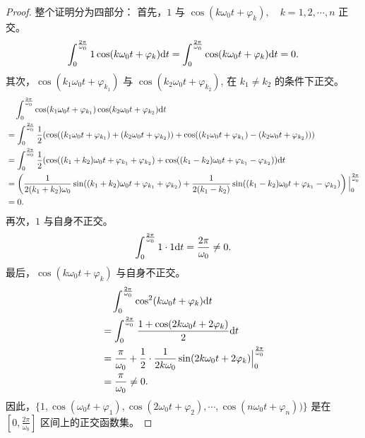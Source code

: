 \begin{proof}
    整个证明分为四部分：
    首先，$1$ 与 $\cos(k\omega_0t + \varphi_k), \quad k = 1, 2, \cdots, n$ 正交。
    \begin{align*}
        \int_{0}^{\frac{2\pi}{\omega_0}}1\cos(k\omega_0t + \varphi_k)\mathrm{d}t
        = \int_{0}^{\frac{2\pi}{\omega_0}}\cos(k\omega_0t + \varphi_k)\mathrm{d}t
        = 0.
    \end{align*}
    其次，$\cos(k_1\omega_0t + \varphi_{k_1})$ 与 $\cos(k_2\omega_0t + \varphi_{k_2})$, 在 $k_1 \ne k_2$ 的条件下正交。
    \begin{align*}
        & \quad \int_{0}^{\frac{2\pi}{\omega_0}}\cos(k_1\omega_0t + \varphi_{k_1})\cos(k_2\omega_0t + \varphi_{k_2})\mathrm{d}t \\
        & = \int_{0}^{\frac{2\pi}{\omega_0}}\frac{1}{2}(\cos((k_1\omega_0t + \varphi_{k_1}) + (k_2\omega_0t + \varphi_{k_2})) + \cos((k_1\omega_0t + \varphi_{k_1}) - (k_2\omega_0t + \varphi_{k_2}))) \\
        & = \int_{0}^{\frac{2\pi}{\omega_0}}\frac{1}{2}(\cos((k_1 + k_2)\omega_0t + \varphi_{k_1} + \varphi_{k_2}) + \cos((k_1 - k_2)\omega_0t + \varphi_{k_1} - \varphi_{k_2}))\mathrm{d}t \\
        & = \left(\frac{1}{2(k_1 + k_2)\omega_0}\sin((k_1 + k_2)\omega_0t + \varphi_{k_1} + \varphi_{k_2})
            + \frac{1}{2(k_1 - k_2)}\sin((k_1 - k_2)\omega_0t + \varphi_{k_1} - \varphi_{k_2})\right)\Big|_{0}^{\frac{2\pi}{\omega_0}} \\
        & = 0.
    \end{align*}
    再次，$1$ 与自身不正交。
    \begin{align*}
        \int_{0}^{\frac{2\pi}{\omega_0}}1\cdot 1\mathrm{d}t
        = \frac{2\pi}{\omega_0} \ne 0.
    \end{align*}
    最后，$\cos(k\omega_0t + \varphi_k)$ 与自身不正交。
    \begin{align*}
        & \quad \int_{0}^{\frac{2\pi}{\omega_0}}\cos^2(k\omega_0t + \varphi_k)\mathrm{d}t \\
        & = \int_{0}^{\frac{2\pi}{\omega_0}}\frac{1 + \cos(2k\omega_0t + 2\varphi_k)}{2}\mathrm{d}t \\
        & = \frac{\pi}{\omega_0} + \frac{1}{2}\cdot\frac{1}{2k\omega_0}\sin(2k\omega_0t + 2\varphi_k)\Big|_{0}^{\frac{2\pi}{\omega_0}} \\
        & = \frac{\pi}{\omega_0} \ne 0.
    \end{align*}
    因此，$\{1, \cos(\omega_0t + \varphi_1), \cos(2\omega_0t + \varphi_2), \cdots, \cos(n\omega_0 t + \varphi_n))\}$
    是在 $[0, \frac{2\pi}{\omega_0}]$ 区间上的正交函数集。
\end{proof}

